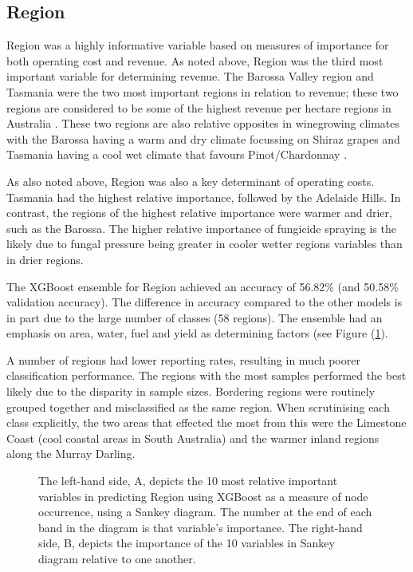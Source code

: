 \documentclass[review,12pt,authoryear]{elsarticle}
\begin{document}
\begin{linenumbers}
\subsection{Region}

Region was a highly informative variable based on measures of importance for both operating cost and revenue. As noted above, Region was the third most important variable for determining revenue. The Barossa Valley region and Tasmania were the two most important regions in relation to revenue; these two regions are considered to be some of the highest revenue per hectare regions in Australia \citep{wineaustraliaNationalVintageReport2022}. These two regions are also relative opposites in winegrowing climates with the Barossa having a warm and dry climate focussing on Shiraz grapes and Tasmania having a cool wet climate that favours Pinot/Chardonnay \citep{wineaustraliaNationalVintageReport2022}.
\par
As also noted above, Region was also a key determinant of operating costs. Tasmania had the highest relative importance, followed by the Adelaide Hills. In contrast, the regions of the highest relative importance were warmer and drier, such as the Barossa. The higher relative importance of fungicide spraying is the likely due to fungal pressure being greater in cooler wetter regions variables than in drier regions.
\par
The XGBoost ensemble for Region achieved an accuracy of 56.82\% (and 50.58\% validation accuracy). The difference in accuracy compared to the other models is in part due to the large number of classes (58 regions). The ensemble had an emphasis on area, water, fuel and yield as determining factors (see Figure (\ref{fig:region_sankey}).
\par
A number of regions had lower reporting rates, resulting in much poorer classification performance. The regions with the most samples performed the best likely due to the disparity in sample sizes. Bordering regions were routinely grouped together and misclassified as the same region. When scrutinising each class explicitly, the two areas that effected the most from this were the Limestone Coast (cool coastal areas in South Australia) and the warmer inland regions along the Murray Darling.

\begin{figure}[htb]
  \caption{The left-hand side, A,  depicts the 10 most relative important variables in predicting Region using XGBoost as a measure of node occurrence, using a Sankey diagram. The number at the end of each band in the diagram is that variable's importance. The right-hand side, B, depicts the importance of the 10 variables in Sankey diagram relative to one another.}\label{fig:region_sankey}
 \end{figure}


\end{linenumbers}
\end{document}
